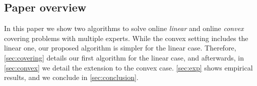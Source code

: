 \subsection{Paper overview}

In this paper we show two algorithms to solve online \emph{linear} and online \emph{convex} covering problems with multiple experts. While the convex setting includes the linear one, our proposed algorithm is simpler for the linear case. Therefore, \cref{sec:covering} details our first algorithm for the linear case, and afterwards, in \cref{sec:convex} we detail the extension to the convex case. \cref{sec:exp} shows empirical results, and we conclude in \cref{sec:conclusion}.